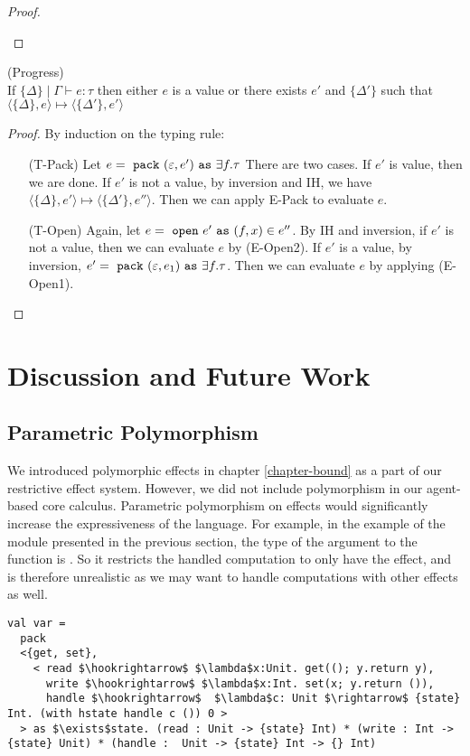 \begin{lemma}
\begin{proof}
\begin{enumerate}
\end{enumerate}
\end{proof}

\end{lemma}

\begin{lemma} (Progress)\\
If $\{\Delta\} \mid \Gamma \vdash e : \tau$ then either $e$ is a value or there exists $e'$ and $\{\Delta'\}$ such that $\langle \{\Delta\}, e \rangle \mapsto \langle \{\Delta'\}, e' \rangle$
\begin{proof}
By induction on the typing rule:
\begin{enumerate}[align=left]
\item[(T-Pack)] Let $e = \ \texttt{pack}\  (\varepsilon, e') \ \texttt{as}\  \exists f. \tau$ There are two cases. If $e'$ is value, then we are done. If $e'$ is not a value, by inversion and IH, we have $\langle \{\Delta\}, e' \rangle \mapsto \langle \{\Delta'\}, e'' \rangle$. Then we can apply E-Pack to evaluate $e$.
\item[(T-Open)] Again, let $e = \ \texttt{open}\  e' \ \texttt{as}\ (f, x) \in e''$. By IH and inversion, if $e'$ is not a value, then we can evaluate $e$ by (E-Open2). If $e'$ is a value, by inversion, $e' = \ \texttt{pack}\  (\varepsilon, e_1) \ \texttt{as}\  \exists f.\tau$. Then we can evaluate $e$ by applying (E-Open1).
\end{enumerate}

\end{proof}
\end{lemma}

\section{Discussion and Future Work}

\subsection{Parametric Polymorphism}

We introduced polymorphic effects in chapter \ref{chapter-bound} as a part of our restrictive effect system. However, we did not include  polymorphism in our agent-based core calculus. Parametric polymorphism on effects would significantly increase the expressiveness of the language. For example, in the example of the  module presented in the previous section, the type of the argument to the  function is . So it restricts the handled computation to only have the  effect, and is therefore unrealistic as we may want to handle computations with other effects as well. 
\begin{lstlisting}[mathescape=true]
val var = 
  pack 
  <{get, set}, 
    < read $\hookrightarrow$ $\lambda$x:Unit. get((); y.return y),
      write $\hookrightarrow$ $\lambda$x:Int. set(x; y.return ()),
      handle $\hookrightarrow$  $\lambda$c: Unit $\rightarrow$ {state} Int. (with hstate handle c ()) 0 >
  > as $\exists$state. (read : Unit -> {state} Int) * (write : Int -> {state} Unit) * (handle :  Unit -> {state} Int -> {} Int)
\end{lstlisting} 

